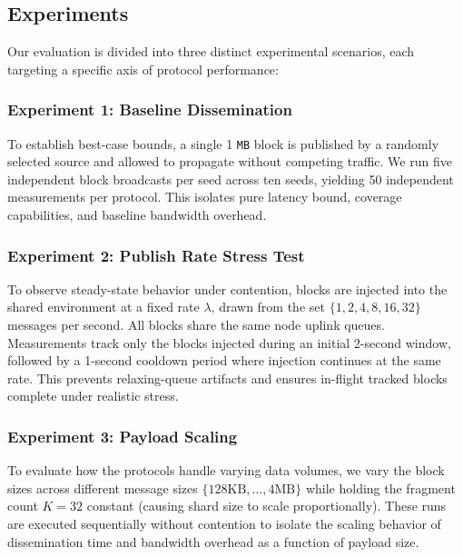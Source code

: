 \documentclass{article}
\begin{document}
\subsection{Experiments}
Our evaluation is divided into three distinct experimental scenarios, each targeting a specific axis of protocol performance:
\subsubsection*{Experiment 1: Baseline Dissemination} 
To establish best-case bounds, a single 1 \texttt{MB} block is published by a randomly selected source and allowed to propagate without competing traffic. We run five independent block broadcasts per seed across ten seeds, yielding 50 independent measurements per protocol. This isolates pure latency bound, coverage capabilities, and baseline bandwidth overhead.

\subsubsection*{Experiment 2: Publish Rate Stress Test} 
To observe steady-state behavior under contention, blocks are injected into the shared environment at a fixed rate $\lambda$, drawn from the set $\{1, 2, 4, 8, 16, 32\}$ messages per second. All blocks share the same node uplink queues. Measurements track only the blocks injected during an initial 2-second window, followed by a 1-second cooldown period where injection continues at the same rate. This prevents relaxing-queue artifacts and ensures in-flight tracked blocks complete under realistic stress.

\subsubsection*{Experiment 3: Payload Scaling}
To evaluate how the protocols handle varying data volumes, we vary the block sizes across different message sizes $\{128\text{KB},\ldots, 4\text{MB}\}$ while holding the fragment count $K=32$ constant (causing shard size to scale proportionally). These runs are executed sequentially without contention to isolate the scaling behavior of dissemination time and bandwidth overhead as a function of payload size.
\end{document}
